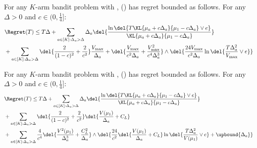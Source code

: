 \begin{corollary} \label{corol:expected-regret-total-max}
    For any $K$-arm bandit problem with , \expklms () has regret bounded as follows. 
    For any $\Delta > 0$ and $c \in (0, \frac{1}{4}]$: 
    \begin{align}
            &\Regret(T)
            \leq
            T\Delta
            +\sum_{a\in[K]:\Delta_a > \Delta} \Delta_a \del{\frac{\ln\del{T\KL{\mu_a+c\Delta_a}{\mu_1-c\Delta_a} \vee e}}{\KL{\mu_a+c\Delta_a}{\mu_1-c\Delta_a}}}
                \nonumber
            \\
            &+
            \sum_{a\in[K]:\Delta_a > \Delta} \del{\frac{2}{(1-c)^2} + \frac{2}{c^2}} \frac{V_{\max}}{\Delta_a}
            +
            \del{\frac{V_{\max}}{c^2 \Delta_a} + \frac{V_{\max}^2}{c^4 \Delta_a^3}} 
            \wedge \del{ \frac{24 V_{\max}}{c^2 \Delta_a} \ln\del{\frac{T\Delta_a^2}{V_{\max}} \vee e}}
        \label{eqn:exp-kl-ms-main-regret-corol-max}
    \end{align}
\end{corollary} 
\begin{corollary} \label{corol:expected-regret-total-lip}
    For any $K$-arm bandit problem with , \expklms () has regret bounded as follows. 
    For any $\Delta > 0$ and $c \in (0, \frac{1}{4}]$: 
    \begin{align}
            &\Regret(T)
            \leq
            T\Delta
            +\sum_{a\in[K]:\Delta_a > \Delta} \Delta_a \del{\frac{\ln\del{T\KL{\mu_a+c\Delta_a}{\mu_1-c\Delta_a} \vee e}}{\KL{\mu_a+c\Delta_a}{\mu_1-c\Delta_a}}}
                \nonumber
            \\
            &+
            \sum_{a\in[K]:\Delta_a > \Delta}  \del{\frac{2}{(1-c)^2} + \frac{2}{c^2}} \del{\frac{V(\mu_1)}{\Delta_a} + C_L}
                \nonumber
            \\
            &+
            \sum_{a\in[K]:\Delta_a > \Delta}  \frac{4}{c^4} \del{\frac{V^2(\mu_1)}{\Delta_a^3} + \frac{C_L^2}{\Delta_a}} 
            \wedge \del{ \frac{24}{c^2} \del{\frac{V(\mu_1)}{\Delta_a} + C_L} \ln\del{\frac{T\Delta_a^2}{V(\mu_1)} \vee e} + \upbound{\Delta_a}}
        \label{eqn:exp-kl-ms-main-regret-corol-lip}
    \end{align}
\end{corollary}    

